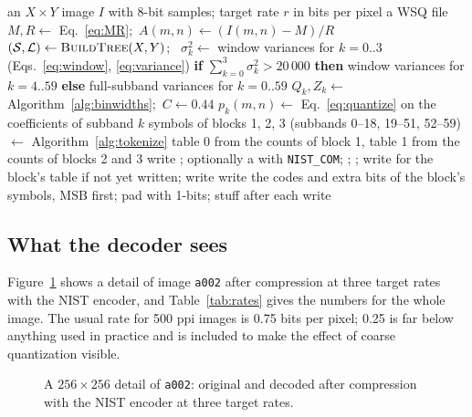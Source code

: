 \begin{algorithm}[ht]
  \caption{Encoder number two.}
  \label{alg:encode}
  \begin{algorithmic}[1]
    \Require an $X \times Y$ image $I$ with 8-bit samples; target rate $r$ in bits per pixel
    \Ensure a WSQ file
    \State $M, R \gets$ Eq.~\eqref{eq:MR};\ $A(m,n) \gets (I(m,n) - M)/R$
    \State $(\mathcal{S}, \mathcal{L}) \gets \Call{BuildTree}{X, Y}$;\  
    \State $\sigma_k^2 \gets$ window variances for $k = 0..3$ (Eqs.~\eqref{eq:window}, \eqref{eq:variance})
    \State \textbf{if} $\sum_{k=0}^{3}\sigma_k^2 > 20\,000$ \textbf{then} window variances for $k = 4..59$
           \textbf{else} full-subband variances for $k = 0..59$
    \State $Q_k, Z_k \gets$ Algorithm~\ref{alg:binwidths};\ $C \gets 0.44$
      \State $p_k(m,n) \gets$ Eq.~\eqref{eq:quantize} on the coefficients of subband $k$
    \EndFor
    \State symbols of blocks 1, 2, 3 (subbands 0--18, 19--51, 52--59) $\gets$ Algorithm~\ref{alg:tokenize}
    \State table 0 from the counts of block 1, table 1 from the counts of blocks 2 and 3 
    \State write ; optionally a  with \texttt{NIST\_COM}; ; ; 
      \State write  for the block's table if not yet written; write 
      \State write the codes and extra bits of the block's symbols, MSB first; pad with 1-bits; stuff  after each 
    \EndFor
    \State write 
  \end{algorithmic}
\end{algorithm}

\subsection{What the decoder sees}

Figure~\ref{fig:rates} shows a detail of image \texttt{a002} after compression at three target
rates with the NIST encoder, and Table~\ref{tab:rates} gives the numbers for the whole image.
The usual rate for 500 ppi images is 0.75 bits per pixel; 0.25 is far below anything used in
practice and is included to make the effect of coarse quantization visible.

\begin{figure}[ht]
  \centering
  
  \caption{A $256 \times 256$ detail of \texttt{a002}: original and decoded after compression
  with the NIST encoder at three target rates.}
  \label{fig:rates}
\end{figure}


